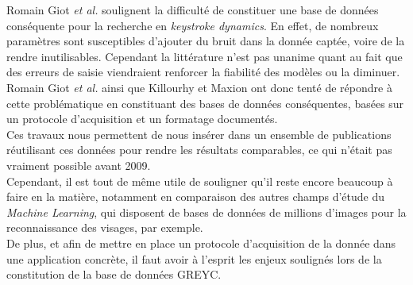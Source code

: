Romain Giot \textit{et al.}\cite{giotGREYC} soulignent la difficulté de constituer une base de données conséquente pour la recherche en \textit{keystroke dynamics}. En effet, de nombreux paramètres sont susceptibles d'ajouter du bruit dans la donnée captée, voire de la rendre inutilisables. Cependant la littérature n'est pas unanime quant au fait que des erreurs de saisie viendraient renforcer la fiabilité des modèles ou la diminuer.\\

Romain Giot \textit{et al.} \cite{giotGREYC} ainsi que Killourhy et Maxion \cite{killourhy2009} ont donc tenté de répondre à cette problématique en constituant des bases de données conséquentes, basées sur un protocole d'acquisition et un formatage documentés.\\

Ces travaux nous permettent de nous insérer dans un ensemble de publications réutilisant ces données pour rendre les résultats comparables, ce qui n'était pas vraiment possible avant 2009.\\

Cependant, il est tout de même utile de souligner qu'il reste encore beaucoup à faire en la matière, notamment en comparaison des autres champs d'étude du \textit{Machine Learning}, qui disposent de bases de données de millions d'images pour la reconnaissance des visages, par exemple.\\

De plus, et afin de mettre en place un protocole d'acquisition de la donnée dans une application concrète, il faut avoir à l'esprit les enjeux soulignés lors de la constitution de la base de données GREYC\cite{giotGREYC}.\\
